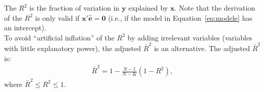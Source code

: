 \noindent The $R^2$ is the fraction of variation in $\bm{y}$ explained by $\bm{x}$. Note that the derivation of the $R^2$ is only valid if $\bm{x}'\bm{\hat{e}} = \bm{0}$ (i.e., if the model in Equation~\eqref{eq:modele} has an intercept).\\

\noindent To avoid ``artificial inflation'' of the $R^2$ by adding irrelevant variables (variables with little explanatory power), the adjusted $\bar{R}^2$ is an alternative. The adjusted $\bar{R}^2$ is: 
		\begin{align}
			\bar{R}^2 = 1 - \frac{ N - 1 }{ N - K } \left( 1 - R^2 \right), 
		\end{align}
\noindent where $\bar{R}^2 \leq R^2 \leq 1$. 
